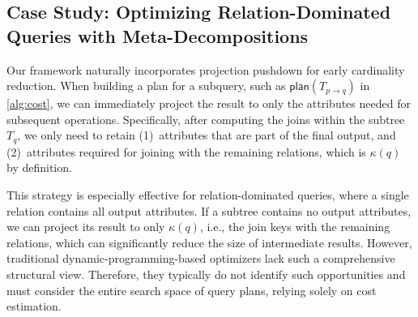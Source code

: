 \subsection{Case Study: Optimizing Relation-Dominated Queries with Meta-Decompositions}

Our framework naturally incorporates projection pushdown for early cardinality reduction. When building a plan for a subquery, such as $\textsf{plan}(T_{p \to q})$ in \cref{alg:cost}, we can immediately project the result to only the attributes needed for subsequent operations.
Specifically, after computing the joins within the subtree $T_q$, we only need to retain (1)~attributes that are part of the final output, and
(2)~attributes required for joining with the remaining relations, which is $\kappa(q)$ by definition.

This strategy is especially effective for relation-dominated queries, where a single relation contains all output attributes.  If a subtree contains no output attributes, we can project its result to only $\kappa(q)$, i.e., the join keys with the remaining relations, which can significantly reduce the size of intermediate results.
However, traditional dynamic-programming-based optimizers lack such a comprehensive structural view. Therefore, they typically do not identify such opportunities and must consider the entire search space of query plans, relying solely on cost estimation.

